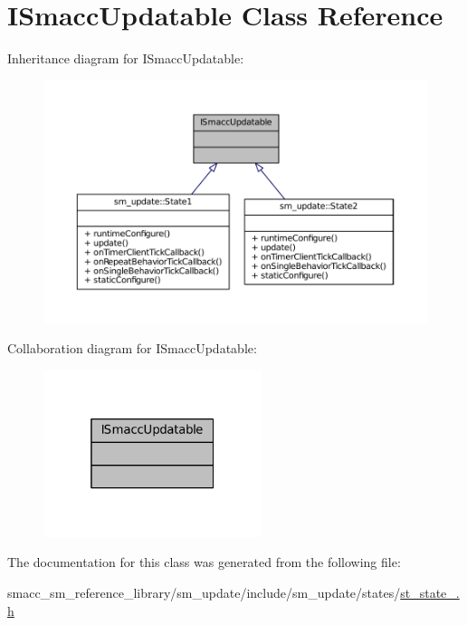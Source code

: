 \hypertarget{classISmaccUpdatable}{}\section{I\+Smacc\+Updatable Class Reference}
\label{classISmaccUpdatable}


Inheritance diagram for I\+Smacc\+Updatable\+:
\nopagebreak
\begin{figure}[H]
\begin{center}
\leavevmode
\includegraphics[width=350pt]{classISmaccUpdatable__inherit__graph}
\end{center}
\end{figure}


Collaboration diagram for I\+Smacc\+Updatable\+:
\nopagebreak
\begin{figure}[H]
\begin{center}
\leavevmode
\includegraphics[width=181pt]{classISmaccUpdatable__coll__graph}
\end{center}
\end{figure}


The documentation for this class was generated from the following file\+:\begin{DoxyCompactItemize}
\item 
smacc\+\_\+sm\+\_\+reference\+\_\+library/sm\+\_\+update/include/sm\+\_\+update/states/\hyperlink{sm__update_2include_2sm__update_2states_2st__state__1_8h}{st\+\_\+state\+\_.\+h}\end{DoxyCompactItemize}

